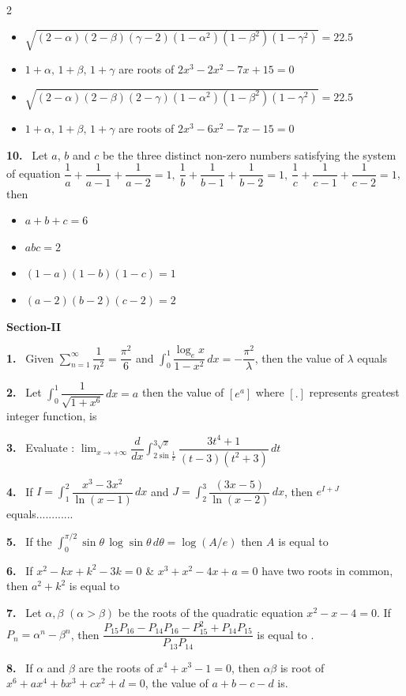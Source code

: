 \documentclass[10pt]{extarticle}
\newcommand{\sect}[1]{\par\smallskip\noindent\textbf{#1}\par}
\newcommand{\qn}[1]{\par\smallskip\noindent\textbf{#1.}~}
\newenvironment{qoptions}{\begin{itemize}[leftmargin=1.8em,itemsep=1pt,topsep=2pt,label={}]}{\end{itemize}}
\newcommand{\opt}[2]{\item[(#1)] #2}
\begin{document}
\begin{multicols}{2}
\begin{qoptions}
\opt{A}{$\sqrt{(2-\alpha)(2-\beta)(\gamma-2)(1-\alpha^2)(1-\beta^2)(1-\gamma^2)}=22.5$}
\opt{B}{$1+\alpha,\,1+\beta,\,1+\gamma$ are roots of $2x^3-2x^2-7x+15=0$}
\opt{C}{$\sqrt{(2-\alpha)(2-\beta)(2-\gamma)(1-\alpha^2)(1-\beta^2)(1-\gamma^2)}=22.5$}
\opt{D}{$1+\alpha,\,1+\beta,\,1+\gamma$ are roots of $2x^3-6x^2-7x-15=0$}
\end{qoptions}
\qn{10} Let $a$, $b$ and $c$ be the three distinct non-zero numbers satisfying the system of equation $\dfrac1a+\dfrac1{a-1}+\dfrac1{a-2}=1,\ \dfrac1b+\dfrac1{b-1}+\dfrac1{b-2}=1,\ \dfrac1c+\dfrac1{c-1}+\dfrac1{c-2}=1$, then
\begin{qoptions}
\opt{A}{$a+b+c=6$}
\opt{B}{$abc=2$}
\opt{C}{$(1-a)(1-b)(1-c)=1$}
\opt{D}{$(a-2)(b-2)(c-2)=2$}
\end{qoptions}
\sect{Section-II}
\qn{1} Given $\displaystyle\sum_{n=1}^{\infty}\dfrac1{n^2}=\dfrac{\pi^2}{6}$ and $\displaystyle\int_0^1\dfrac{\log_ex}{1-x^2}\,dx=-\dfrac{\pi^2}{\lambda}$, then the value of $\lambda$ equals
\qn{2} Let $\displaystyle\int_0^1\dfrac{1}{\sqrt{1+x^6}}\,dx=a$ then the value of $[e^a]$ where $[.]$ represents greatest integer function, is
\qn{3} Evaluate : $\displaystyle\lim_{x\to+\infty}\dfrac{d}{dx}\int_{2\sin\frac1x}^{3\sqrt x}\dfrac{3t^4+1}{(t-3)(t^2+3)}\,dt$
\qn{4} If $I=\displaystyle\int_1^2\dfrac{x^3-3x^2}{\ln(x-1)}\,dx$ and $J=\displaystyle\int_2^3\dfrac{(3x-5)}{\ln(x-2)}\,dx$, then $e^{I+J}$ equals............
\qn{5} If the $\displaystyle\int_0^{\pi/2}\sin\theta\,\log\sin\theta\,d\theta=\log(A/e)$ then $A$ is equal to
\qn{6} If $x^2-kx+k^2-3k=0$ \& $x^3+x^2-4x+a=0$ have two roots in common, then $a^2+k^2$ is equal to
\qn{7} Let $\alpha,\beta$ $(\alpha>\beta)$ be the roots of the quadratic equation $x^2-x-4=0$. If $P_n=\alpha^n-\beta^n$, then $\dfrac{P_{15}P_{16}-P_{14}P_{16}-P_{15}^2+P_{14}P_{15}}{P_{13}P_{14}}$ is equal to \underline{\hspace{1.2cm}}.
\qn{8} If $\alpha$ and $\beta$ are the roots of $x^4+x^3-1=0$, then $\alpha\beta$ is root of $x^6+ax^4+bx^3+cx^2+d=0$, the value of $a+b-c-d$ is\underline{\hspace{1.2cm}}.
\end{multicols}
\end{document}
